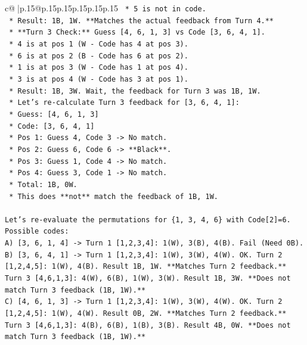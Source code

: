 \documentclass{article}
\begin{document}
{\begin{supertabular}{c@{$\;$}|p{.15\linewidth}@{}p{.15\linewidth}p{.15\linewidth}p{.15\linewidth}p{.15\linewidth}p{.15\linewidth}}
{{{\texttt{        *   5 is not in code.} \\
\texttt{        *   Result: 1B, 1W. **Matches the actual feedback from Turn 4.**} \\
\texttt{    *   **Turn 3 Check:** Guess {[}4, 6, 1, 3{]} vs Code {[}3, 6, 4, 1{]}.} \\
\texttt{        *   4 is at pos 1 (W {-} Code has 4 at pos 3).} \\
\texttt{        *   6 is at pos 2 (B {-} Code has 6 at pos 2).} \\
\texttt{        *   1 is at pos 3 (W {-} Code has 1 at pos 4).} \\
\texttt{        *   3 is at pos 4 (W {-} Code has 3 at pos 1).} \\
\texttt{        *   Result: 1B, 3W. Wait, the feedback for Turn 3 was 1B, 1W.} \\
\texttt{        *   Let's re{-}calculate Turn 3 feedback for {[}3, 6, 4, 1{]}:} \\
\texttt{            *   Guess: {[}4, 6, 1, 3{]}} \\
\texttt{            *   Code: {[}3, 6, 4, 1{]}} \\
\texttt{            *   Pos 1: Guess 4, Code 3 {-}> No match.} \\
\texttt{            *   Pos 2: Guess 6, Code 6 {-}> **Black**.} \\
\texttt{            *   Pos 3: Guess 1, Code 4 {-}> No match.} \\
\texttt{            *   Pos 4: Guess 3, Code 1 {-}> No match.} \\
\texttt{            *   Total: 1B, 0W.} \\
\texttt{            *   This does **not** match the feedback of 1B, 1W.} \\
\\ 
\texttt{Let's re{-}evaluate the permutations for \{1, 3, 4, 6\} with Code{[}2{]}=6.} \\
\texttt{Possible codes:} \\
\texttt{A) {[}3, 6, 1, 4{]} {-}> Turn 1 {[}1,2,3,4{]}: 1(W), 3(B), 4(B). Fail (Need 0B).} \\
\texttt{B) {[}3, 6, 4, 1{]} {-}> Turn 1 {[}1,2,3,4{]}: 1(W), 3(W), 4(W). OK. Turn 2 {[}1,2,4,5{]}: 1(W), 4(B). Result 1B, 1W. **Matches Turn 2 feedback.** Turn 3 {[}4,6,1,3{]}: 4(W), 6(B), 1(W), 3(W). Result 1B, 3W. **Does not match Turn 3 feedback (1B, 1W).**} \\
\texttt{C) {[}4, 6, 1, 3{]} {-}> Turn 1 {[}1,2,3,4{]}: 1(W), 3(W), 4(W). OK. Turn 2 {[}1,2,4,5{]}: 1(W), 4(W). Result 0B, 2W. **Matches Turn 2 feedback.** Turn 3 {[}4,6,1,3{]}: 4(B), 6(B), 1(B), 3(B). Result 4B, 0W. **Does not match Turn 3 feedback (1B, 1W).**} \\
}}}
\end{supertabular}}
\end{document}
